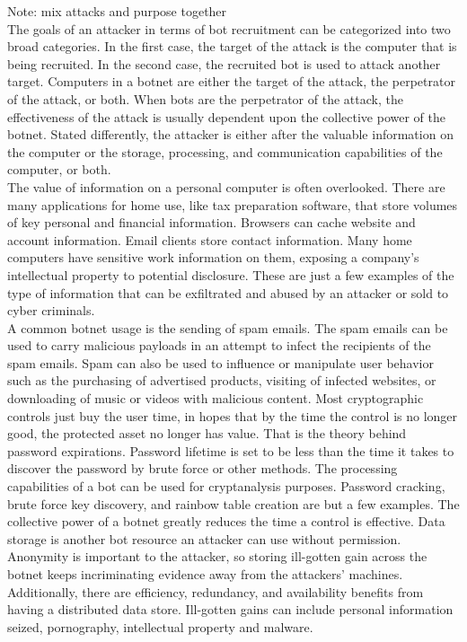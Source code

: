 Note: mix attacks and purpose together\\
The goals of an attacker in terms of bot recruitment can be categorized into two
broad categories. In the first case, the target of the attack is the computer that is being recruited. In the second case, the recruited bot is used to attack another target. Computers in a botnet are either the target of the attack, the perpetrator of the attack, or both. When bots are the perpetrator of the attack, the effectiveness of the attack is usually dependent upon the collective power of the botnet. Stated differently, the attacker is either after the valuable information on the computer or the storage, processing, and communication capabilities of the computer, or both. \\
The value of information on a personal computer is often overlooked. There are
many applications for home use, like tax preparation software, that store volumes of key personal and financial information. Browsers can cache website and account information. Email clients store contact information. Many home computers have sensitive work information on them, exposing a company's intellectual property to potential disclosure. These are just a few examples of the type of information that can be exfiltrated and abused by an attacker or sold to cyber criminals.\\A common botnet usage is the sending of spam emails. The spam emails can be used to carry malicious payloads in an attempt to infect the recipients of the spam emails. Spam can also be used to influence or manipulate user behavior such as the purchasing of advertised products, visiting of infected websites, or downloading of music or videos with malicious content.
Most cryptographic controls just buy the user time, in hopes that by the time the control is no longer good, the protected asset no longer has value. That is the theory behind password expirations. Password lifetime is set to be less than the time it takes to discover the password by brute force or other methods. The processing capabilities of a bot can be used for cryptanalysis purposes. Password cracking, brute force key discovery, and rainbow table creation are but a few examples. The collective power of a botnet greatly reduces the time a control is effective. Data storage is another bot resource an attacker can use without permission. Anonymity is important to the attacker, so storing ill-gotten gain across the botnet keeps incriminating evidence away from the attackers' machines. Additionally, there are efficiency, redundancy, and availability benefits from having a distributed data store. Ill-gotten gains can include personal information seized, pornography, intellectual property and malware.\\

